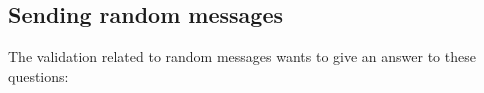 \subsection{Sending random messages}
%
%
%
%
The validation related to random messages wants to give an answer to these questions: 

